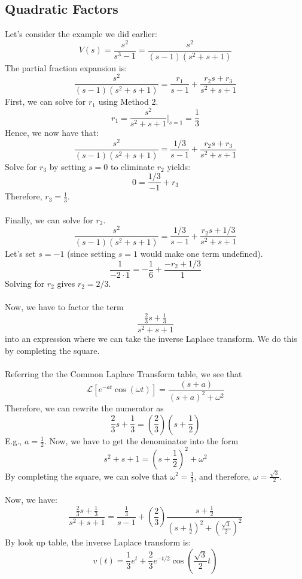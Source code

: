 \documentclass[10pt]{article}
\newcommand{\laplace}{\mathcal{L}}
\begin{document}
\subsection*{Quadratic Factors}
Let's consider the example we did earlier:
\[V(s) = \frac{s^2}{s^3 - 1} = \frac{s^2}{(s - 1)(s^2 + s + 1)}\]
The partial fraction expansion is:
\[\frac{s^2}{(s - 1)(s^2 + s + 1)} = \frac{r_1}{s - 1} + \frac{r_2 s + r_3}{s^2 + s + 1}\]
First, we can solve for $r_1$ using Method 2.
\[r_1 = \frac{s^2}{s^2 + s + 1}\bigg|_{s = 1} = \frac{1}{3}\]
Hence, we now have that:
\[\frac{s^2}{(s - 1)(s^2 + s + 1)} = \frac{1/3}{s - 1} + \frac{r_2 s + r_3}{s^2 + s + 1}\]
Solve for $r_3$ by setting $s = 0$ to eliminate $r_2$ yields:
\[0 = \frac{1/3}{-1} + r_3\]
Therefore, $r_3 = \frac{1}{3}$.\\\\
Finally, we can solve for $r_2$.
\[\frac{s^2}{(s - 1)(s^2 + s + 1)} = \frac{1/3}{s - 1} + \frac{r_2 s + 1/3}{s^2 + s + 1}\]
Let's set $s = -1$ (since setting $s = 1$ would make one term undefined).
\[\frac{1}{-2 \cdot 1} = -\frac{1}{6} + \frac{-r_2 + 1/3}{1}\]
Solving for $r_2$ gives $r_2 = 2/3$.\\\\
Now, we have to factor the term
\[\frac{\frac{2}{3} s + \frac{1}{3}}{s^2 + s + 1}\]
into an expression where we can take the inverse Laplace transform.  We do this by completing the square.\\\\
Referring the the Common Laplace Transform table, we see that
\[\laplace[e^{-at}\cos(\omega t)] = \frac{(s + a)}{(s + a)^2 + \omega^2}\]
Therefore, we can rewrite the numerator as
\[\frac{2}{3} s + \frac{1}{3} = \left(\frac{2}{3}\right)\left(s + \frac{1}{2}\right)\]
E.g., $a = \frac{1}{2}$.  Now, we have to get the denominator into the form
\[s^2 + s + 1 = \left(s + \frac{1}{2}\right)^2 + \omega^2\]
By completing the square, we can solve that $\omega^2 = \frac{3}{4}$, and therefore, $\omega = \frac{\sqrt{3}}{{2}}$.\\\\
Now, we have:
\[\frac{\frac{2}{3}s + \frac{1}{3}}{s^2 + s + 1} = \frac{\frac{1}{3}}{s - 1} + \left(\frac{2}{3}\right)\frac{s + \frac{1}{2}}{(s + \frac{1}{2})^2 + (\frac{\sqrt{3}}{2})^2}\]
By look up table, the inverse Laplace transform is:
\[v(t) = \frac{1}{3}e^t + \frac{2}{3}e^{-t/2} \cos\left(\frac{\sqrt{3}}{2}t\right)\]
\end{document}
